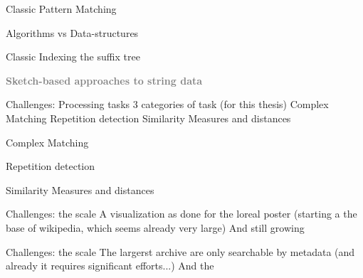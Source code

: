 \documentclass[aspectratio=169,10pt]{beamer}
\begin{document}
\begin{frame}{Classic Pattern Matching}

\end{frame}

\begin{frame}{Algorithms vs Data-structures}

\end{frame}

\begin{frame}{Classic Indexing the suffix tree}

\end{frame}

\begin{frame}
    \vfill
    \bigskip
    \begin{center}
        \textbf{\textcolor{gray}{Sketch-based approaches to   string data}}
    \end{center}
    \vfill
\end{frame}

\begin{frame}{Challenges: Processing tasks}
3 categories of task (for this thesis)
Complex Matching
Repetition detection
Similarity Measures and distances
\end{frame}

 \begin{frame}{Complex Matching}
    
 \end{frame}

 \begin{frame}{Repetition detection}
    
 \end{frame}

 \begin{frame}{Similarity Measures and distances}
    
 \end{frame}

\begin{frame}{Challenges: the scale}
    A visualization as done for the loreal poster (starting a the base of wikipedia, which seems already very large)
    And still growing
\end{frame}

\begin{frame}{Challenges: the scale}
    The largerst archive are only searchable by metadata (and already it requires significant efforts...)
    And the 
\end{frame}
\end{document}
